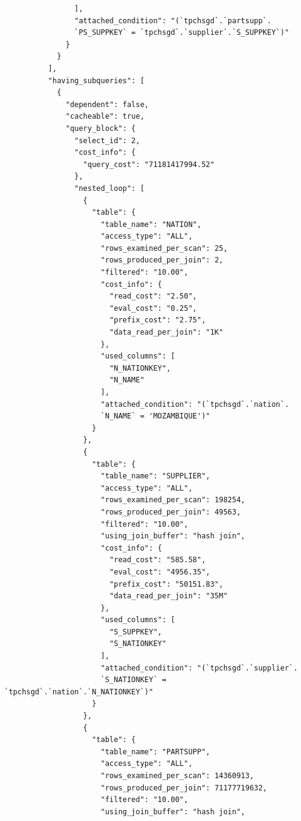 \documentclass{article}
\begin{document}
\begin{lstlisting}
                ],
                "attached_condition": "(`tpchsgd`.`partsupp`.
                `PS_SUPPKEY` = `tpchsgd`.`supplier`.`S_SUPPKEY`)"
              }
            }
          ],
          "having_subqueries": [
            {
              "dependent": false,
              "cacheable": true,
              "query_block": {
                "select_id": 2,
                "cost_info": {
                  "query_cost": "71181417994.52"
                },
                "nested_loop": [
                  {
                    "table": {
                      "table_name": "NATION",
                      "access_type": "ALL",
                      "rows_examined_per_scan": 25,
                      "rows_produced_per_join": 2,
                      "filtered": "10.00",
                      "cost_info": {
                        "read_cost": "2.50",
                        "eval_cost": "0.25",
                        "prefix_cost": "2.75",
                        "data_read_per_join": "1K"
                      },
                      "used_columns": [
                        "N_NATIONKEY",
                        "N_NAME"
                      ],
                      "attached_condition": "(`tpchsgd`.`nation`.
                      `N_NAME` = 'MOZAMBIQUE')"
                    }
                  },
                  {
                    "table": {
                      "table_name": "SUPPLIER",
                      "access_type": "ALL",
                      "rows_examined_per_scan": 198254,
                      "rows_produced_per_join": 49563,
                      "filtered": "10.00",
                      "using_join_buffer": "hash join",
                      "cost_info": {
                        "read_cost": "585.58",
                        "eval_cost": "4956.35",
                        "prefix_cost": "50151.83",
                        "data_read_per_join": "35M"
                      },
                      "used_columns": [
                        "S_SUPPKEY",
                        "S_NATIONKEY"
                      ],
                      "attached_condition": "(`tpchsgd`.`supplier`.
                      `S_NATIONKEY` = `tpchsgd`.`nation`.`N_NATIONKEY`)"
                    }
                  },
                  {
                    "table": {
                      "table_name": "PARTSUPP",
                      "access_type": "ALL",
                      "rows_examined_per_scan": 14360913,
                      "rows_produced_per_join": 71177719632,
                      "filtered": "10.00",
                      "using_join_buffer": "hash join",

\end{lstlisting}
\end{document}
